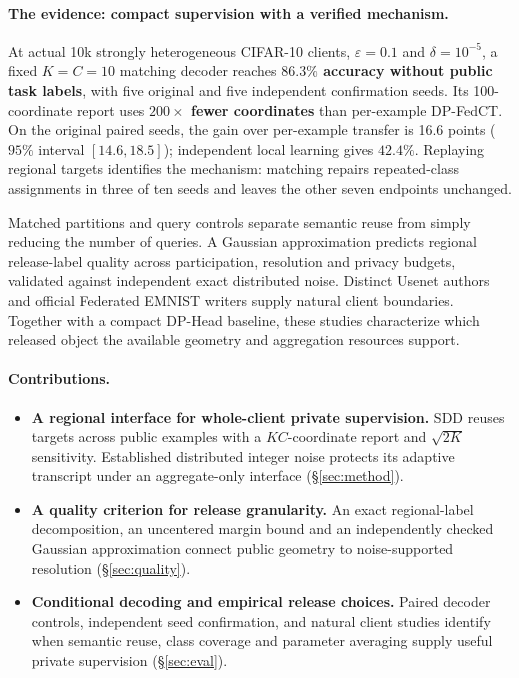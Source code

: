 \paragraph{The evidence: compact supervision with a verified mechanism.}
At actual 10k strongly heterogeneous CIFAR-10 clients, $\varepsilon=0.1$ and
$\delta=10^{-5}$, a fixed $K=C=10$ matching decoder reaches
\textbf{$86.3\%$ accuracy without public task labels}, with five original and
five independent confirmation seeds. Its 100-coordinate report uses
\textbf{$200\times$ fewer coordinates} than per-example DP-FedCT.
On the original paired seeds, the gain over per-example transfer is
16.6 points ($95\%$ interval $[14.6,18.5]$); independent local learning gives
$42.4\%$. Replaying regional targets identifies the mechanism: matching
repairs repeated-class assignments in three of ten seeds and leaves the
other seven endpoints unchanged.

Matched partitions and query controls separate semantic reuse from simply
reducing the number of queries. A Gaussian approximation predicts regional
release-label quality across participation, resolution and privacy budgets,
validated against independent exact distributed noise. Distinct Usenet authors
and official Federated EMNIST writers supply natural client boundaries.
Together with a compact DP-Head baseline, these studies characterize which
released object the available geometry and aggregation resources support.

\paragraph{Contributions.}
\begin{itemize}[leftmargin=1.2em,itemsep=1pt,topsep=2pt]
\item \textbf{A regional interface for whole-client private supervision.}
SDD reuses targets across public examples with a $KC$-coordinate report and
$\sqrt{2K}$ sensitivity. Established distributed integer noise protects its
adaptive transcript under an aggregate-only interface (\S\ref{sec:method}).
\item \textbf{A quality criterion for release granularity.}
An exact regional-label decomposition, an uncentered margin bound and an
independently checked Gaussian approximation connect public geometry to
noise-supported resolution (\S\ref{sec:quality}).
\item \textbf{Conditional decoding and empirical release choices.}
Paired decoder controls, independent seed confirmation, and natural client
studies identify when semantic reuse, class coverage and parameter averaging
supply useful private supervision (\S\ref{sec:eval}).
\end{itemize}
